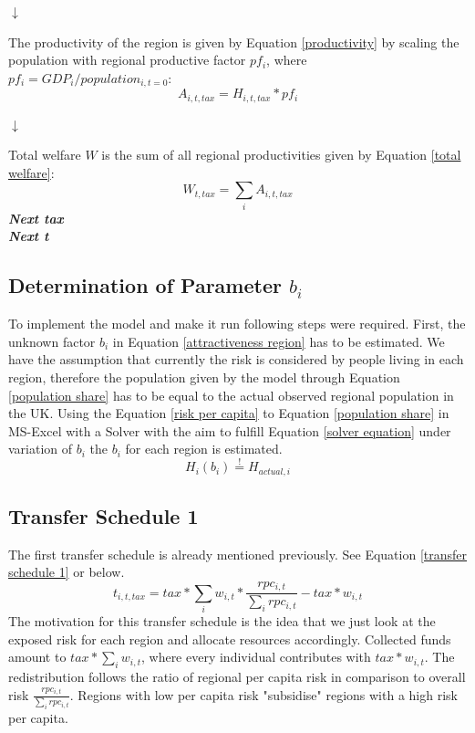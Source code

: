 \documentclass[10pt,a4paper]{article}
\begin{document}
\begin{center}
\begin{center}
    $\downarrow$
\end{center}
The productivity of the region is given by Equation \ref{productivity} by scaling the population with regional productive factor $pf_i$, where $pf_i = GDP_i / population_{i,t=0}$:
\begin{equation}
    A_{i,t,tax} = H_{i,t,tax} * pf_i
    \label{productivity}
\end{equation}

\begin{center}
    $\downarrow$
\end{center}
Total welfare $W$ is the sum of all regional productivities given by Equation \ref{total welfare}:
\begin{equation}
    W_{t,tax} = \sum_i A_{i,t,tax}
    \label{total welfare}
\end{equation}
\vspace{.25cm}
\newline
\textbf{\textit{Next tax}}
\\
\textbf{\textit{Next t}}
\end{center}

\subsection{Determination of Parameter $b_i$}
To implement the model and make it run following steps were required.
First, the unknown factor $b_i$ in Equation \ref{attractiveness region} has to be estimated. We have the assumption that currently the risk is considered by people living in each region, therefore the population given by the model through Equation \ref{population share} has to be equal to the actual observed regional population in the UK. Using the Equation \ref{risk per capita} to Equation \ref{population share} in MS-Excel with a Solver with the aim to fulfill Equation \ref{solver equation} under variation of $b_i$ the $b_i$ for each region is estimated.
\begin{equation}
    H_i(b_i) \stackrel{!}{=}  H_{actual,i}
    \label{solver equation}
\end{equation}

\subsection{Transfer Schedule 1}
The first transfer schedule is already mentioned previously. See Equation \ref{transfer schedule 1} or below.
\begin{equation}
    t_{i,t,tax} = tax * \sum_i w_{i,t} * \frac{rpc_{i,t}}{\sum_i rpc_{i,t}} - tax * w_{i,t}
    \label{transfer schedule 1 again}
\end{equation}
The motivation for this transfer schedule is the idea that we just look at the exposed risk for each region and allocate resources accordingly. Collected funds amount to $tax * \sum_i w_{i,t}$, where every individual contributes with $tax * w_{i,t}$. The redistribution follows the ratio of regional per capita risk in comparison to overall risk $\frac{rpc_{i,t}}{\sum_i rpc_{i,t}}$. Regions with low per capita risk "subsidise" regions with a high risk per capita.
\end{document}

